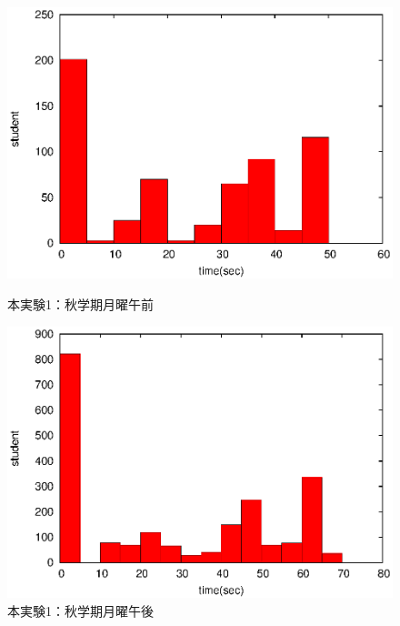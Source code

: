 \documentclass[a4paper,10pt]{jarticle}
\begin{document}
\fi

\begin{figure}[htpb]                        
\begin{minipage} {0.5\hsize}                             
\begin{center}                              
\includegraphics[bb=0 0 390 248,clip,width=\hsize]{xMo12_hist.eps}   
\caption{本実験1：秋学期月曜午前}                              
\label{xMo12}                                
\end{center}                                    
\end{minipage}                                 
\begin{minipage}{0.5\hsize}                                            
\begin{center}                              
\includegraphics[bb=0 0 390 248,clip,width=\hsize]{xMo345_hist.eps}   
\caption{本実験1：秋学期月曜午後}                              
\label{xMo345}                                
\end{center}                                    
\end{minipage}                                 
\end{figure}                                 
\end{document}
